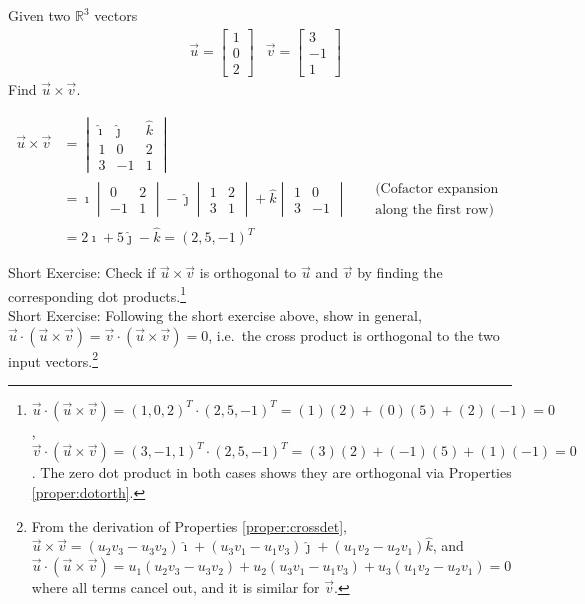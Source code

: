 \begin{exmp}
Given two $\mathbb{R}^3$ vectors
\begin{align*}
&\vec{u} =
\begin{bmatrix}
1 \\
0 \\
2
\end{bmatrix}
&\vec{v} =
\begin{bmatrix}
3 \\
-1 \\
1
\end{bmatrix}
\end{align*}
Find $\vec{u} \times \vec{v}$.
\end{exmp}
\begin{solution}
\begin{align*}
\vec{u} \times \vec{v} &=
\begin{vmatrix}
\hat{\imath} & \hat{\jmath} & \hat{k} \\
1 & 0 & 2 \\
3 & -1 & 1
\end{vmatrix} \\
&= 
\hat{\imath}
\begin{vmatrix}
0 & 2 \\
-1 & 1 
\end{vmatrix}
- \hat{\jmath}
\begin{vmatrix}
1 & 2 \\
3 & 1 
\end{vmatrix}
+ \hat{k}
\begin{vmatrix}
1 & 0 \\
3 & -1 
\end{vmatrix}
& \begin{aligned}
&\text{(Cofactor expansion} \\ 
&\text{along the first row)}
\end{aligned}\\
&= 2\hat{\imath} + 5\hat{\jmath} - \hat{k} = (2,5,-1)^T
\end{align*} 
\end{solution}
Short Exercise: Check if $\vec{u} \times \vec{v}$ is orthogonal to $\vec{u}$ and $\vec{v}$ by finding the corresponding dot products.\footnote{$\vec{u} \cdot (\vec{u} \times \vec{v}) = (1,0,2)^T\cdot(2,5,-1)^T = (1)(2) + (0)(5) + (2)(-1) = 0$, $\vec{v} \cdot (\vec{u} \times \vec{v}) = (3,-1,1)^T\cdot(2,5,-1)^T = (3)(2) + (-1)(5) + (1)(-1) = 0$. The zero dot product in both cases shows they are orthogonal via Properties \ref{proper:dotorth}.}\\
Short Exercise: Following the short exercise above, show in general, $\vec{u} \cdot (\vec{u} \times \vec{v}) = \vec{v} \cdot (\vec{u} \times \vec{v}) = 0$, i.e.\ the cross product is orthogonal to the two input vectors.\footnote{From the derivation of Properties \ref{proper:crossdet}, $\vec{u} \times \vec{v} = (u_2v_3 - u_3v_2)\hat{\imath} + (u_3v_1 - u_1v_3)\hat{\jmath} + (u_1v_2 - u_2v_1)\hat{k}$, and $\vec{u} \cdot (\vec{u} \times \vec{v}) = u_1(u_2v_3 - u_3v_2) + u_2(u_3v_1 - u_1v_3) + u_3(u_1v_2 - u_2v_1) = 0$ where all terms cancel out, and it is similar for $\vec{v}$.}

